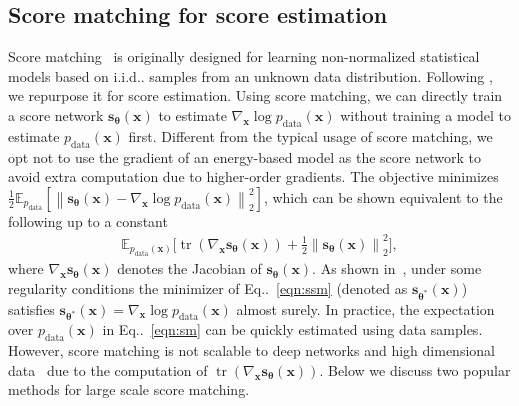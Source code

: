 \documentclass{article}
\makeatletter
\newcommand{\mbb}[1]{\mathbb{#1}}
\newcommand{\norm}[1]{\left\lVert#1\right\rVert}
\def\@onedot{\ifx\@let@token.\else.\null\fi\xspace}
\DeclareRobustCommand\onedot{\futurelet\@let@token\@onedot}
\newcommand{\eqnref}[1]{Eq\onedot~\eqref{#1}}
\newcommand{\bfx}{\mathbf{x}}
\newcommand{\bftheta}{{\boldsymbol{\theta}}}
\newcommand{\bfs}{\mathbf{s}}
\def\iid{i.i.d\onedot}
\makeatother
\begin{document}
\subsection{Score matching for score estimation}\label{sec:sm}
Score matching~\cite{hyvarinen2005estimation} is originally designed for learning non-normalized statistical models based on \iid samples from an unknown data distribution. Following \cite{song2019ssm}, we repurpose it for score estimation. Using score matching, we can directly train a score network $\bfs_\bftheta(\bfx)$ to estimate $\nabla_\bfx \log p_\text{data}(\bfx)$ without training a model to estimate $p_\text{data}(\bfx)$ first. Different from the typical usage of score matching, we opt not to use the gradient of an energy-based model as the score network to avoid extra computation due to higher-order gradients. The objective minimizes $\frac{1}{2} \mbb{E}_{p_\text{data}}[\norm{\bfs_\bftheta(\bfx) - \nabla_\bfx \log p_\text{data}(\bfx)}_2^2]$, which can be shown equivalent to the following up to a constant \begin{align}
  \mbb{E}_{p_\text{data}(\bfx)}\bigg[\operatorname{tr}(\nabla_{\bfx} \bfs_\bftheta(\bfx)) + \frac{1}{2}\norm{ \bfs_\bftheta(\bfx)}_2^2\bigg],\label{eqn:sm}
\end{align}
where $\nabla_\bfx \bfs_\bftheta(\bfx)$ denotes the Jacobian of $\bfs_\bftheta(\bfx)$. As shown in~\cite{song2019ssm}, under some regularity conditions the minimizer of \eqnref{eqn:ssm} (denoted as $\bfs_{\bftheta^*}(\bfx)$) satisfies $\bfs_{\bftheta^*}(\bfx) = \nabla_\bfx \log p_\text{data}(\bfx)$ almost surely. In practice, the expectation over $p_\text{data}(\bfx)$ in \eqnref{eqn:sm} can be quickly estimated using data samples. However, score matching is not scalable to deep networks and high dimensional data~\cite{song2019ssm} due to the computation of $\operatorname{tr}(\nabla_{\bfx} \bfs_\bftheta(\bfx))$. Below we discuss two popular methods for large scale score matching.
\end{document}
